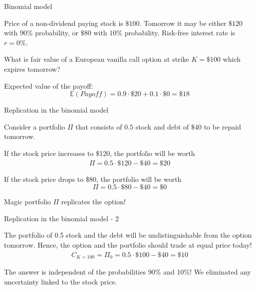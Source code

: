 \documentclass{beamer}
\begin{document}
\begin{frame}{Binomial model}
\centering
{}

\justify
Price of a non-dividend paying stock is $\$100$. Tomorrow it may be either $\$120$ with $90\%$ probability, or $\$80$ with  $10\%$ probability. Risk-free interest rate is $r=0\%$.

\justify
What is fair value of a European vanilla call option at strike $K=\$100$ which expires tomorrow?

\justify
Expected value of the payoff:
$$\mathbb{E}(Payoff) = 0.9\cdot \$20 + 0.1\cdot \$0 = \$18 $$
\end{frame}



\begin{frame}{Replication in the binomial model}
\centering
{}

\justify
Consider a portfolio $\Pi$ that consists of $0.5$ stock and debt of $\$40$ to be repaid tomorrow.

\justify
If the stock price increases to \$120, the portfolio will be worth
\begin{align*}\Pi = 0.5\cdot\$120 - \$40 = \$20\end{align*}

\justify
If the stock price drops to \$80, the portfolio will be worth
$$\Pi = 0.5 \cdot \$80 - \$40 = \$0$$

\justify
Magic portfolio  $\Pi$ \alert{replicates} the option!
\end{frame}



\begin{frame}{Replication in the binomial model - 2 }
\centering
{}


\justify
The portfolio of 0.5 stock and the debt will be undistinguishable from the option \alert{tomorrow}. Hence, the option and the portfolio should trade at equal price \alert{today}!
\begin{align*}
C_{K=100} = \Pi_0 = 0.5 \cdot \$100 - \$40 = \$10
\end{align*}

\justify
The answer is independent of the probabilities 90\% and 10\%! We eliminated any uncertainty linked to the stock price.
\end{frame}
\end{document}

